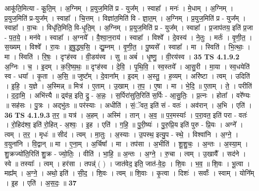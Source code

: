 \documentclass[17pt]{extarticle}
\begin{document}
                  आकू॑ति॒मित्या - कू॒ति॒म् । अ॒ग्निम् । प्र॒युज॒मिति॑ प्र - युज᳚म् । स्वाहा᳚ । मनः॑ । मे॒धाम् । अ॒ग्निम् । प्र॒युज॒मिति॑ प्र-युज᳚म् । स्वाहा᳚ । चि॒त्तम् । विज्ञा॑त॒मिति॑ वि - ज्ञा॒त॒म् । अ॒ग्निम् । प्र॒युज॒मिति॑ प्र - युज᳚म् । स्वाहा᳚ । वा॒चः । विधृ॑ति॒मिति॒ वि-धृ॒ति॒म् । अ॒ग्निम् । प्र॒युज॒मिति॑ प्र - युज᳚म् । स्वाहा᳚ । प्र॒जाप॑तय॒ इति॑ प्र॒जा - प॒त॒ये॒ । मन॑वे । स्वाहा᳚ । अ॒ग्नये᳚ । वै॒श्वा॒न॒राय॑ । स्वाहा᳚ । विश्वे᳚ । दे॒वस्य॑ । ने॒तुः । मर्तः॑ । वृ॒णी॒त॒ । स॒ख्यम् । विश्वे᳚ । रा॒यः । इ॒षु॒द्ध्य॒सि॒ । द्यु॒म्नम् । वृ॒णी॒त॒ । पु॒ष्यसे᳚ । स्वाहा᳚ । मा । स्विति॑ । भि॒त्थाः॒ । मा । स्विति॑ । रि॒षः॒ । दृꣳह॑स्व । वी॒डय॑स्व । सु ॥ अबं॑ । धृ॒ष्णु॒ । वी॒रय॑स्व । \textbf{  35} \newline
                  \newline
                                \textbf{ TS 4.1.9.2} \newline
                  अ॒ग्निः । च॒ । इ॒दम् । क॒रि॒ष्य॒थः॒ ॥ दृꣳह॑स्व । दे॒वि॒ । पृ॒थि॒वि॒ । स्व॒स्तये᳚ । आ॒सु॒री । मा॒या । स्व॒धयेति॑ स्व - धया᳚ । कृ॒ता । अ॒सि॒ ॥ जुष्ट᳚म् । दे॒वाना᳚म् । इ॒दम् । अ॒स्तु॒ । ह॒व्यम् । अरि॑ष्टा । त्वम् । उदिति॑ । इ॒हि॒ । य॒ज्ञे । अ॒स्मिन्न् ॥ मित्र॑ । ए॒ताम् । उ॒खाम् । त॒प॒ । ए॒षा । मा । भे॒दि॒ ॥ ए॒ताम् । ते॒ । परीति॑ । द॒दा॒मि॒ । अभि॑त्त्यै ॥ द्र्‌व॑न्न॒ इति॒ द्रु - अ॒न्नः॒ । स॒र्पिरा॑सुति॒रिति॑ स॒र्पिः - आ॒सु॒तिः॒ । प्र॒त्नः । होता᳚ । वरे᳚ण्यः ॥ सह॑सः । पु॒त्रः । अद्भु॑तः ॥ पर॑स्याः । अधीति॑ । सं॒ॅवत॒ इति॑ सं - वतः॑ । अव॑रान् । अ॒भि । एति॑ । \textbf{  36} \newline
                  \newline
                                \textbf{ TS 4.1.9.3} \newline
                  त॒र॒ ॥ यत्र॑ । अ॒हम् । अस्मि॑ । तान् । अ॒व॒ ॥ प॒र॒मस्याः᳚ । प॒रा॒वत॒ इति॑ परा - वतः॑ । रो॒हिद॑श्व॒ इति॑ रो॒हित् - अ॒श्वः॒ । इ॒ह । एति॑ । ग॒हि॒ ॥ पु॒री॒ष्यः॑ । पु॒रु॒प्रि॒य इति॑ पुरु - प्रि॒यः । अग्ने᳚ । त्वम् । त॒र॒ । मृधः॑ ॥ सीद॑ । त्वम् । मा॒तुः । अ॒स्याः । उ॒पस्थ॒ इत्यु॒प - स्थे॒ । विश्वा॑नि । अ॒ग्ने॒ । व॒युना॑नि । वि॒द्वान् ॥ मा । ए॒ना॒म् । अ॒र्चिषा᳚ । मा । तप॑सा । अ॒भीति॑ । शू॒शु॒चः॒ । अ॒न्तः । अ॒स्या॒म् । शु॒क्रज्यो॑ति॒रिति॑ शु॒क्र - ज्यो॒तिः॒ । वीति॑ । भा॒हि॒ ॥ अ॒न्तः । अ॒ग्ने॒ । रु॒चा । त्वम् । उ॒खायै᳚ । सद॑ने । स्वे ॥ तस्याः᳚ । त्वम् । हर॑सा । तपन्न्॑ ( ) । जात॑वेद॒ इति॒ जात॑-वे॒दः॒ । शि॒वः । भ॒व॒ ॥ शि॒वः । भू॒त्वा । मह्य᳚म् । अ॒ग्ने॒ । अथो॒ इति॑ । सी॒द॒ । शि॒वः । त्वम् ॥ शि॒वाः । कृ॒त्वा । दिशः॑ । सर्वाः᳚ । स्वाम् । योनि᳚म् । इ॒ह । एति॑ । अ॒स॒दः॒ ॥ \textbf{  37} \newline
                  \newline
\end{document}
